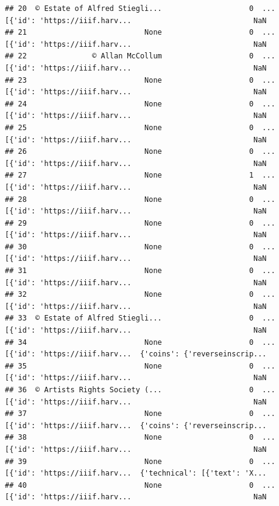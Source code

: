 \documentclass[
]{book}
\begin{document}
\begin{verbatim}
## 20  © Estate of Alfred Stiegli...                    0  ...  [{'id': 'https://iiif.harv...                            NaN
## 21                           None                    0  ...  [{'id': 'https://iiif.harv...                            NaN
## 22               © Allan McCollum                    0  ...  [{'id': 'https://iiif.harv...                            NaN
## 23                           None                    0  ...  [{'id': 'https://iiif.harv...                            NaN
## 24                           None                    0  ...  [{'id': 'https://iiif.harv...                            NaN
## 25                           None                    0  ...  [{'id': 'https://iiif.harv...                            NaN
## 26                           None                    0  ...  [{'id': 'https://iiif.harv...                            NaN
## 27                           None                    1  ...  [{'id': 'https://iiif.harv...                            NaN
## 28                           None                    0  ...  [{'id': 'https://iiif.harv...                            NaN
## 29                           None                    0  ...  [{'id': 'https://iiif.harv...                            NaN
## 30                           None                    0  ...  [{'id': 'https://iiif.harv...                            NaN
## 31                           None                    0  ...  [{'id': 'https://iiif.harv...                            NaN
## 32                           None                    0  ...  [{'id': 'https://iiif.harv...                            NaN
## 33  © Estate of Alfred Stiegli...                    0  ...  [{'id': 'https://iiif.harv...                            NaN
## 34                           None                    0  ...  [{'id': 'https://iiif.harv...  {'coins': {'reverseinscrip...
## 35                           None                    0  ...  [{'id': 'https://iiif.harv...                            NaN
## 36  © Artists Rights Society (...                    0  ...  [{'id': 'https://iiif.harv...                            NaN
## 37                           None                    0  ...  [{'id': 'https://iiif.harv...  {'coins': {'reverseinscrip...
## 38                           None                    0  ...  [{'id': 'https://iiif.harv...                            NaN
## 39                           None                    0  ...  [{'id': 'https://iiif.harv...  {'technical': [{'text': 'X...
## 40                           None                    0  ...  [{'id': 'https://iiif.harv...                            NaN

\end{verbatim}
\end{document}
